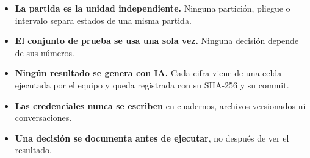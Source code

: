\begin{itemize}
  \item \textbf{La partida es la unidad independiente.} Ninguna partici\'on,
        pliegue o intervalo separa estados de una misma partida.
  \item \textbf{El conjunto de prueba se usa una sola vez.} Ninguna
        decisi\'on depende de sus n\'umeros.
  \item \textbf{Ning\'un resultado se genera con IA.} Cada cifra viene de una
        celda ejecutada por el equipo y queda registrada con su SHA-256 y su
        commit.
  \item \textbf{Las credenciales nunca se escriben} en cuadernos, archivos
        versionados ni conversaciones.
  \item \textbf{Una decisi\'on se documenta antes de ejecutar}, no despu\'es
        de ver el resultado.
\end{itemize}